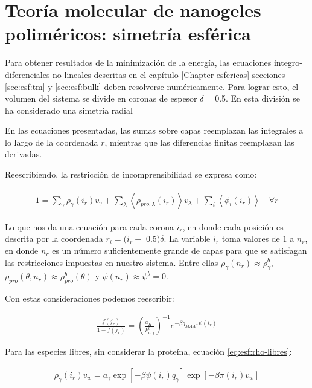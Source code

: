 \section{Teor\'ia molecular de nanogeles polim\'ericos: simetr\'ia esf\'erica}


Para obtener resultados de la minimizaci\'on de la energ\'ia, las ecuaciones integro-diferenciales no lineales descritas en el cap\'itulo \ref{Chapter-esfericas} secciones \ref{sec:esf:tm} y \ref{sec:esf:bulk} deben resolverse num\'ericamente. Para lograr esto, el volumen del sistema se divide en coronas de espesor $\delta = $0.5. En esta divisi\'on se ha considerado una simetr\'ia radial 

En las ecuaciones presentadas, las sumas sobre capas reemplazan las integrales a lo largo de la coordenada $r$, mientras que las diferencias finitas reemplazan las derivadas.

Reescribiendo, la restricci\'on de incomprensibilidad se expresa como:

\begin{align}
	\begin{aligned}
		1=  {\sum_{\gamma}\rho_\gamma(i_r) v_\gamma + \sum_\lambda{\left<\rho_{pro,\lambda}(i_r)\right>v_\lambda} + \sum_i{\left<\phi_i(i_r)\right>}} \quad \forall r
		\label{eq:esf:pi-ir}
	\end{aligned}
\end{align}

Lo que nos da una ecuaci\'on para cada corona $i_r$, en donde cada posici\'on es descrita por la coordenada $r_i = (i_r -$ 0.5$)\delta$. 
La variable $i_r$ toma valores de $1$ a $n_r$, en donde $n_r$ es un n\'umero suficientemente grande de capas para que se satisfagan las restricciones impuestas en nuestro sistema. Entre ellas
$\rho_\gamma(n_r) \approx \rho_\gamma^b$, $\rho_{pro}(\theta,n_r) \approx \rho_{pro}^b(\theta)$ y $\psi(n_r) \approx \psi^b = 0$.

Con estas consideraciones podemos reescribir:


\begin{align}
	\frac{f(j_r)}{1-f(j_r)}= \left(\frac{a_{H^+}}{k^0_{a,j}}\right)^{-1} e^{-\beta q_{MAA^-}\psi(i_r)}
\end{align}


Para las especies libres, sin considerar la prote\'ina, ecuaci\'on \ref{eq:esf:rho-libres}:

\begin{align}
	\rho_\gamma(i_r)v_w = a_\gamma \exp{[-\beta \psi(i_r)q_\gamma]} \exp{[-\beta\pi(i_r) v_w]}
\end{align}

